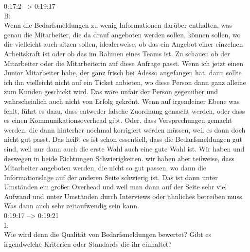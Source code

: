 0:17:2 --> 0:19:17\\
B:\\
Wenn die Bedarfsmeldungen zu wenig Informationen darüber enthalten, was genau die Mitarbeiter, die da drauf angeboten werden sollen, können sollen, wo die vielleicht auch sitzen sollen, idealerweise, ob das ein Angebot einer einzelnen Arbeitskraft ist oder ob das im Rahmen eines Teams ist. Zu schauen ob der Mitarbeiter oder die Mitarbeiterin auf diese Anfrage passt. Wenn ich jetzt einen Junior Mitarbeiter habe, der ganz frisch bei Adesso angefangen hat, dann sollte ich ihn vielleicht nicht auf ein Ticket anbieten, wo diese Person dann ganz alleine zum Kunden geschickt wird. Das wäre unfair der Person gegenüber und wahrscheinlich auch nicht von Erfolg gekrönt. Wenn auf irgendeiner Ebene was fehlt, führt es dazu, dass entweder falsche Zuordnung gemacht werden, oder dass es einen Kommunikationsoverhead gibt. Oder, dass Versprechungen gemacht werden, die dann hinterher nochmal korrigiert werden müssen, weil es dann doch nicht gut passt. Das heißt es ist schon essentiell, dass die Bedarfsmeldungen gut sind, weil nur dann auch die erste Wahl auch eine gute Wahl ist. Wir haben und deswegen in beide Richtungen Schwierigkeiten. wir haben aber teilweise, dass Mitarbeiter angeboten werden, die nicht so gut passen, wo dann die Informationslage auf der anderen Seite schwierig ist. Das ist dann unter Umständen ein großer Overhead und weil man dann auf der Seite sehr viel Aufwand und unter Umständen durch Interviews oder ähnliches betreiben muss. Was dann auch sehr zeitaufwendig sein kann.\\

0:19:17 --> 0:19:21\\
I:\\
Wie wird denn die Qualität von Bedarfsmeldungen bewertet? Gibt es irgendwelche Kriterien oder Standards die ihr einhaltet?\\

